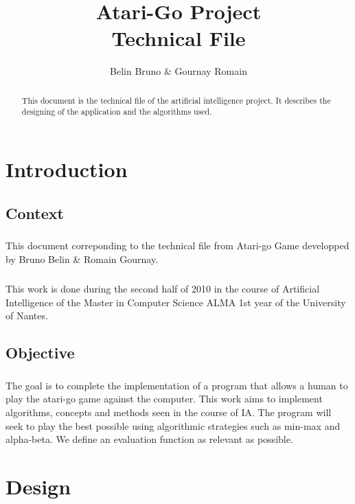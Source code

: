 \documentclass[a4paper,12pt]{report}
\title{Atari-Go Project  \\  \bigskip{} Technical File}
\author{
Belin Bruno \&
Gournay Romain
}
\begin{document}
\maketitle



\begin{abstract}
      
This document is the technical file of the artificial intelligence project. It describes the designing of the application and the algorithms used.

\end{abstract}

\tableofcontents

\chapter{Introduction}
\label{chap:Designing}

\section{Context}
\paragraph*{}
This document correponding to the technical file from Atari-go Game developped by Bruno Belin \& Romain Gournay. 
\paragraph*{}
This work is done during the second half of 2010 in the course of Artificial Intelligence of the Master in Computer Science ALMA 1st year of the University of Nantes.

\section{Objective}
\paragraph*{}
The goal is to complete the implementation of a program that allows a human to play the atari-go game against the computer. This work aims to implement algorithms, concepts and methods seen in the course of IA. The program will seek to play the best possible using algorithmic strategies such as min-max and alpha-beta. We define an evaluation function as relevant as possible.


\chapter{Design}
\end{document}
